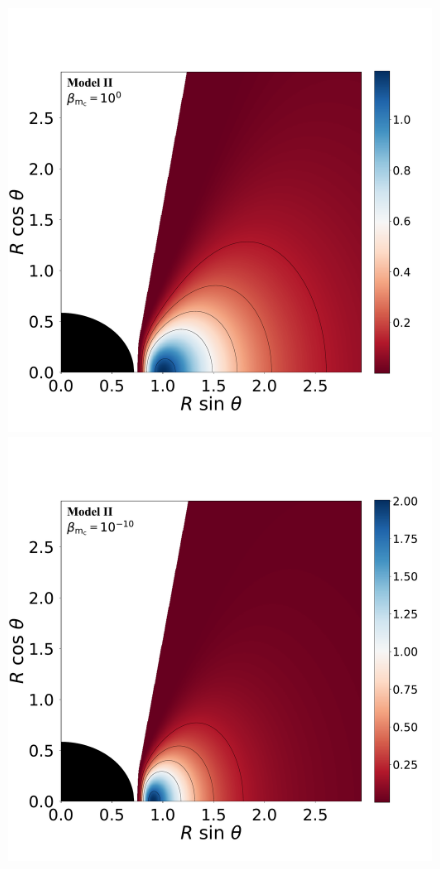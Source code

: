 \documentclass[twocolumn,aps,showpacs,showkeys,prd,superscriptaddress,byrevtex, amsmath]{revtex4-1}
\begin{document}
\begin{figure}
\hspace{-0.3cm}
\includegraphics[scale=0.14]{figures/fig3_II_1.pdf}
\hspace{-0.2cm}
\includegraphics[scale=0.14]{figures/fig3_II__10.pdf}

\end{figure}
\end{document}
